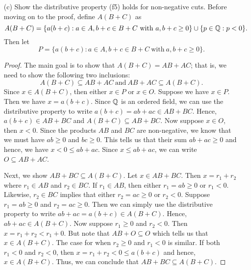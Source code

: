 \begin{enumerate}
\begin{proof}
        \[  A I \subseteq A  \ \text{and} \ A \subseteq A  I. \]
        Let \( x \in A I  \). Then we have \( xp < x \cdot 1 = x   \) which tells us \( xp \in  A  \) and we have \( A I \subseteq A   \). Now if \( x \in A  \), then we have \( x \cdot 1 > xp  \) and hence \( x \in A  I \). Thus, we have \( A \subseteq AI  \). Hence, \(  AI = A  \). 
        \end{proof}

    \item[(c)] Show the distributive property (f5) holds for non-negative cuts.
        Before moving on to the proof, define \( A(B+C)  \) as 
        \[  A(B+C) = \{ a(b+c) : a \in A, b+c \in B+C \ \text{with} \ a, b+c \geq 0   \} \cup  \{ p \in \mathbb{Q} : p < 0  \}. \] Then let 
        \[  P = \{ a(b+c) : a \in A , b+c \in B + C \ \text{with} \ a, b+c \geq 0   \}.  \]
        \begin{proof}
        The main goal is to show that \( A (B+C) = AB + AC \); that is, we need to show the following two inclusions:
        \[  A (B+C) \subseteq AB+AC  \ \text{and} \  AB+AC \subseteq  A (B+C). \]
        Since \( x \in A(B+C)  \), then either \( x \in  P  \) or \( x \in O  \). Suppose we have \( x \in P  \). Then we have \( x = a(b+c)  \). Since \( \mathbb{Q}  \) is an ordered field, we can use the distributive property to write \( a(b+c) = ab+ ac \in AB + BC   \). Hence, \( a(b+c) \in AB + BC  \) and \( A(B+C) \subseteq AB + BC  \). Now suppose \( x \in O  \), then \( x < 0  \). Since the products \( AB  \) and \( BC  \) are non-negative, we know that we must have \( ab \geq 0  \) and \( bc \geq 0  \). This tells us that their sum \( ab + ac \geq 0  \) and hence, we have \( x <  0 \leq ab + ac   \). Since \( x \leq ab + ac  \), we can write \( O \subseteq AB + AC  \).  

        Next, we show \( AB + BC \subseteq A(B+C) \). Let \( x \in AB + BC \). Then \( x = r_{1} + r_{2}  \) where \( r_{1} \in AB \) and \( r_{2} \in BC \). If \( r_{1} \in AB  \), then either \( r_{1} = ab \geq 0  \) or \( r_{1} < 0  \). Likewise, \( r_{2} \in BC \) implies that either \( r_{2} = ac \geq 0  \) or \( r_{2} < 0  \). Suppose \( r_{1} = ab \geq 0  \) and \( r_{2} = ac \geq  0  \). Then we can simply use the distributive property to write \( ab + ac = a (b+c)  \in A(B+C)  \). Hence, \( ab + ac \in A(B+C) \). Now suppose \(  r_{1} \geq 0  \) and \( r_{2} < 0  \). Then \( x = r_{1} + r_{2} < r_{1} + 0 \). But note that \( AB + O \subseteq O  \) which tells us that \( x \in A(B+C) \). The case for when \( r_{2} \geq  0   \) and \( r_{1} < 0  \) is similar. If both \( r_{1} < 0  \) and \( r_{2} < 0  \), then \( x = r_{1} + r_{2} < 0 \leq a(b+c)  \) and hence, \( x \in A(B+C)  \). Thus, we can conclude that \( AB + BC \subseteq A(B+C) \).
        \end{proof}
\end{enumerate}


